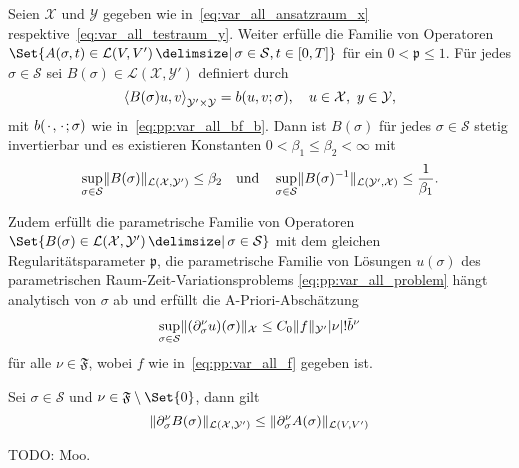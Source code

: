 \begin{Satz}
\label{thm:kunoth:theorem21}
    Seien $\mathcal X$ und $\mathcal Y$ gegeben wie in~\eqref{eq:var_all_ansatzraum_x} respektive~\eqref{eq:var_all_testraum_y}.
    Weiter erfülle die Familie von Operatoren $\Set{ A(\sigma, t) \in \mathcal L(V, V') \given \sigma \in \mathcal S, t \in [0, T] }$  für ein $0 < \mathfrak p \leq 1$.
    Für jedes $\sigma \in \mathcal S$ sei $B(\sigma) \in \mathcal L(\mathcal X, \mathcal Y')$ definiert durch
    \begin{equation}
        \label{eq:var_all_gross_b_parametrisch}
        \left\langle B(\sigma) u,v\right\rangle_{\mathcal Y' \times \mathcal Y} = b(u, v; \sigma), \quad u \in \mathcal X,~y \in \mathcal Y,
    \end{equation}
    mit $b({\mkern2mu\cdot\mkern2mu}, {\mkern2mu\cdot\mkern2mu}; \sigma)$ wie in~\eqref{eq:pp:var_all_bf_b}.
    Dann ist $B(\sigma)$ für jedes $\sigma \in \mathcal S$ stetig invertierbar und es existieren Konstanten $0 < \beta_{1} \leq \beta_{2} < \infty$ mit
    \begin{equation}
        \label{eq:var_all_norm_B_und_B_inv_parametrisch}
        \sup_{\sigma \in \mathcal S} \lVert B(\sigma)\rVert_{\mathcal L(\mathcal X, \mathcal Y')} \leq \beta_{2} \quad \text{und} \quad  \sup_{\sigma \in \mathcal S} \lVert B(\sigma)^{-1}\rVert_{\mathcal L(\mathcal Y', \mathcal X)} \leq \frac{1}{\beta_{1}}.
    \end{equation}

    Zudem erfüllt die parametrische Familie von Operatoren $\Set{ B(\sigma) \in \mathcal L(\mathcal X, \mathcal Y') \given \sigma \in \mathcal S }$  mit dem gleichen Regularitätsparameter $\mathfrak p$, die parametrische Familie von Lösungen $u(\sigma)$ des parametrischen Raum-Zeit-Variationsproblems \eqref{eq:pp:var_all_problem} hängt analytisch von $\sigma$ ab und erfüllt die A-Priori-Abschätzung
    \begin{equation}
        \label{eq:var_all_a_priori_schranke}
        \sup_{\sigma \in \mathcal S} \lVert(\partial^{\nu}_{\sigma} u)(\sigma)\rVert_{\mathcal X} \leq C_{0} \lVert f\rVert_{\mathcal Y'} \lvert\nu\rvert! \tilde{b}^{\nu}
    \end{equation}
    für alle $\nu \in \mathfrak F$, wobei $f$ wie in~\eqref{eq:pp:var_all_f} gegeben ist.
\end{Satz}

\begin{Lemma}
\label{lemma:norm_B_beschraenkt_durch_norm_A}
    Sei $\sigma \in \mathcal S$ und $\nu \in \mathfrak F \setminus \Set{ 0 }$, dann gilt
    \begin{equation}
        \lVert\partial^{\nu}_{\sigma} B(\sigma)\rVert_{\mathcal L(\mathcal X, \mathcal Y')}
        \leq
        \lVert\partial^{\nu}_{\sigma} A(\sigma)\rVert_{\mathcal L(V, V')}
    \end{equation}

    \begin{Beweis}
        TODO: Moo.
    \end{Beweis}
\end{Lemma}

